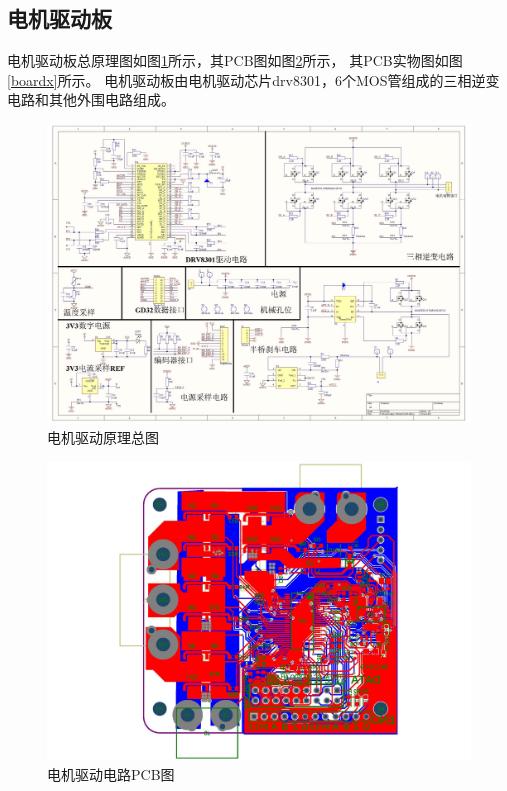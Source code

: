﻿\documentclass[12pt,a4paper]{article}
\begin{document}
\subsection{电机驱动板}
电机驱动板总原理图如图\ref{board2}所示，其PCB图如图\ref{board3}所示，
其PCB实物图如图\ref{boardx}所示。
电机驱动板由电机驱动芯片drv8301，6个MOS管组成的三相逆变电路和其他外围电路组成。
\begin{figure}[!h]
  \centering
  \includegraphics[width=\textwidth]{./picture/GDriver_Seperate_页面_1.jpg}
  \caption{电机驱动原理总图}
  \label{board2}
\end{figure}
\begin{figure}[!h]
  \centering
  \includegraphics[width=\textwidth]{./picture/GDriver_Seperate_页面_2.jpg}
  \caption{电机驱动电路PCB图}
  \label{board3}
\end{figure}
\end{document}
